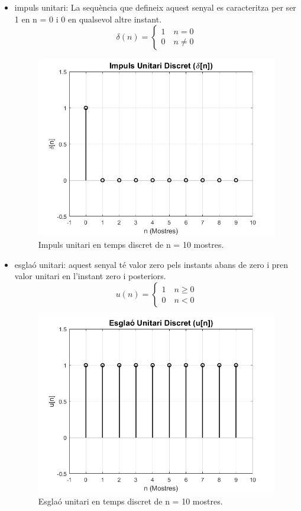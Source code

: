\begin{itemize}
    \item impuls unitari: La sequència que defineix aquest senyal es caracteritza per ser 1 en n = 0 i 0 en qualsevol altre instant. 
    \begin{equation}\label{delta_unit}
        \delta(n) = \left\lbrace\begin{array}{c} 1\quad n = 0 \\ 0\quad n \neq 0 \end{array}\right.
    \end{equation}
    \begin{figure}[H]
        \centering
        \includegraphics[width=0.5\linewidth]{Images/imatge_delta.png}
        \caption{Impuls unitari en temps discret de n = 10 mostres.}
        \label{delta_imp_fig}
    \end{figure}
    \item esglaó unitari: aquest senyal té valor zero pels instants abans de zero i pren valor unitari en l'instant zero i posteriors.
    \begin{equation}\label{step_unit}
        u(n) = \left\lbrace\begin{array}{c} 1\quad n \geq 0 \\ 0\quad n < 0 \end{array}\right.
    \end{equation}
    \begin{figure}[H]
        \centering
        \includegraphics[width=0.5\linewidth]{Images/imatge_esglao.png}
        \caption{Esglaó unitari en temps discret de n = 10 mostres.}

\end{figure}
\end{itemize}
